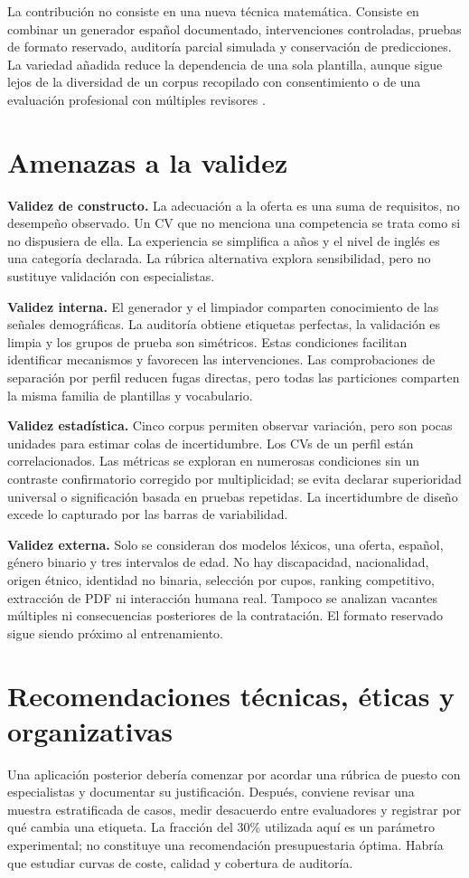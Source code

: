 \documentclass[11pt,a4paper,oneside]{report}
\begin{document}
La contribución no consiste en una nueva técnica matemática. Consiste en combinar un generador español documentado, intervenciones controladas, pruebas de formato reservado, auditoría parcial simulada y conservación de predicciones. La variedad añadida reduce la dependencia de una sola plantilla, aunque sigue lejos de la diversidad de un corpus recopilado con consentimiento o de una evaluación profesional con múltiples revisores \cite{saldivar2025}.

\section{Amenazas a la validez}
\textbf{Validez de constructo.} La adecuación a la oferta es una suma de requisitos, no desempeño observado. Un CV que no menciona una competencia se trata como si no dispusiera de ella. La experiencia se simplifica a años y el nivel de inglés es una categoría declarada. La rúbrica alternativa explora sensibilidad, pero no sustituye validación con especialistas.

\textbf{Validez interna.} El generador y el limpiador comparten conocimiento de las señales demográficas. La auditoría obtiene etiquetas perfectas, la validación es limpia y los grupos de prueba son simétricos. Estas condiciones facilitan identificar mecanismos y favorecen las intervenciones. Las comprobaciones de separación por perfil reducen fugas directas, pero todas las particiones comparten la misma familia de plantillas y vocabulario.

\textbf{Validez estadística.} Cinco corpus permiten observar variación, pero son pocas unidades para estimar colas de incertidumbre. Los CVs de un perfil están correlacionados. Las métricas se exploran en numerosas condiciones sin un contraste confirmatorio corregido por multiplicidad; se evita declarar superioridad universal o significación basada en pruebas repetidas. La incertidumbre de diseño excede lo capturado por las barras de variabilidad.

\textbf{Validez externa.} Solo se consideran dos modelos léxicos, una oferta, español, género binario y tres intervalos de edad. No hay discapacidad, nacionalidad, origen étnico, identidad no binaria, selección por cupos, ranking competitivo, extracción de PDF ni interacción humana real. Tampoco se analizan vacantes múltiples ni consecuencias posteriores de la contratación. El formato reservado sigue siendo próximo al entrenamiento.

\section{Recomendaciones técnicas, éticas y organizativas}
Una aplicación posterior debería comenzar por acordar una rúbrica de puesto con especialistas y documentar su justificación. Después, conviene revisar una muestra estratificada de casos, medir desacuerdo entre evaluadores y registrar por qué cambia una etiqueta. La fracción del 30\% utilizada aquí es un parámetro experimental; no constituye una recomendación presupuestaria óptima. Habría que estudiar curvas de coste, calidad y cobertura de auditoría.
\end{document}
